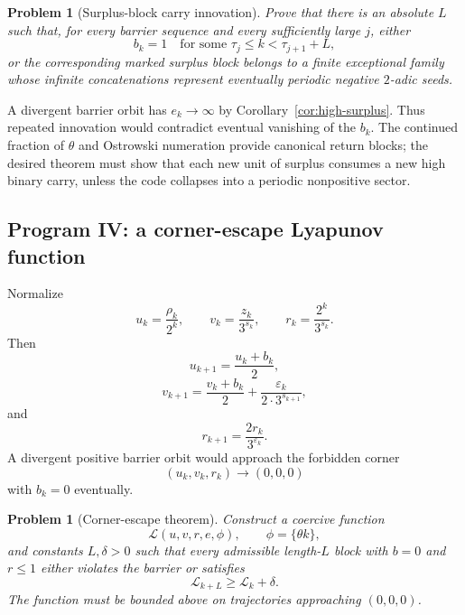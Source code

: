 \documentclass[11pt,reqno]{amsart}
\numberwithin{equation}{section}
\newtheorem{problem}[theorem]{Problem}
\theoremstyle{definition}
\theoremstyle{remark}
\newcommand{\eps}{\varepsilon}
\begin{document}
\begin{problem}[Surplus-block carry innovation]\label{prob:surplus-innovation}
Prove that there is an absolute $L$ such that, for every barrier sequence and
every sufficiently large $j$, either
\begin{equation}\label{eq:surplus-carry-window}
b_k=1
\quad\text{for some }\tau_j\le k<\tau_{j+1}+L,
\end{equation}
or the corresponding marked surplus block belongs to a finite exceptional
family whose infinite concatenations represent eventually periodic negative
$2$-adic seeds.
\end{problem}

A divergent barrier orbit has $e_k\to\infty$ by
Corollary~\ref{cor:high-surplus}.  Thus repeated innovation would contradict
eventual vanishing of the $b_k$.  The continued fraction of $\theta$ and
Ostrowski numeration provide canonical return blocks; the desired theorem
must show that each new unit of surplus consumes a new high binary carry,
unless the code collapses into a periodic nonpositive sector.

\subsection{Program IV: a corner-escape Lyapunov function}

Normalize
\begin{equation}\label{eq:normalized-corner-state}
u_k=\frac{\rho_k}{2^k},
\qquad
v_k=\frac{z_k}{3^{s_k}},
\qquad
r_k=\frac{2^k}{3^{s_k}}.
\end{equation}
Then
\begin{equation}\label{eq:u-dynamics}
u_{k+1}=\frac{u_k+b_k}{2},
\end{equation}
\begin{equation}\label{eq:v-dynamics}
v_{k+1}
=
\frac{v_k+b_k}{2}
+
\frac{\eps_k}{2\cdot3^{s_{k+1}}},
\end{equation}
and
\begin{equation}\label{eq:r-dynamics}
r_{k+1}=\frac{2r_k}{3^{\eps_k}}.
\end{equation}
A divergent positive barrier orbit would approach the forbidden corner
\[
(u_k,v_k,r_k)\to(0,0,0)
\]
with $b_k=0$ eventually.

\begin{problem}[Corner-escape theorem]\label{prob:corner-escape}
Construct a coercive function
\[
\mathcal L(u,v,r,e,\phi),
\qquad
\phi=\{\theta k\},
\]
and constants $L,\delta>0$ such that every admissible length-$L$ block with
$b=0$ and $r\le1$ either violates the barrier or satisfies
\begin{equation}\label{eq:Lyapunov-increase}
\mathcal L_{k+L}\ge\mathcal L_k+\delta.
\end{equation}
The function must be bounded above on trajectories approaching
$(0,0,0)$.
\end{problem}
\end{document}

